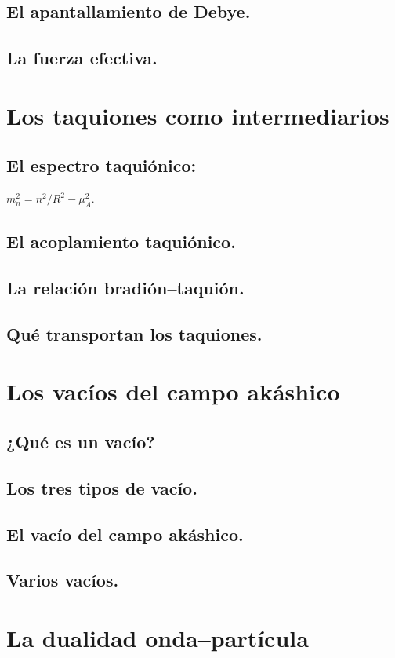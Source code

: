 \documentclass[11pt,a4paper]{article}
\begin{document}
\subsection{El apantallamiento de Debye.}
\subsection{La fuerza efectiva.}

\section{Los taquiones como intermediarios}
\subsection{El espectro taquiónico:} $m_n^2 = n^2/R^2 - \mu_A^2$.
\subsection{El acoplamiento taquiónico.}
\subsection{La relación bradión--taquión.}
\subsection{Qué transportan los taquiones.}

\section{Los vacíos del campo akáshico}
\subsection{¿Qué es un vacío?}
\subsection{Los tres tipos de vacío.}
\subsection{El vacío del campo akáshico.}
\subsection{Varios vacíos.}

\section{La dualidad onda--partícula}
\end{document}

